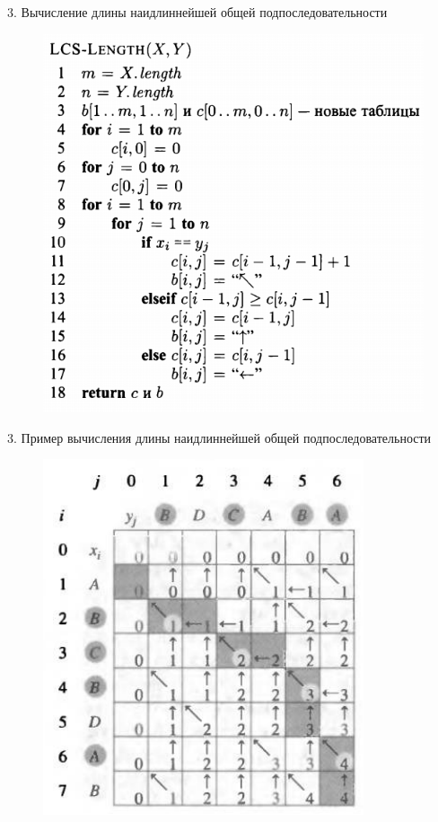 \documentclass{beamer}
\begin{document}
\begin{frame}{3. Вычисление длины наидлиннейшей общей подпоследовательности}
    \begin{figure}[h]
		\centering
		\includegraphics[scale=0.5]{images/lec09-pic21.png}
	\end{figure}
\end{frame}

\begin{frame}{3. Пример вычисления длины наидлиннейшей общей подпоследовательности}
     \begin{figure}[h]
		\centering
		\includegraphics[scale=0.6]{images/lec09-pic22.png}
	\end{figure}
\end{frame}
\end{document}
